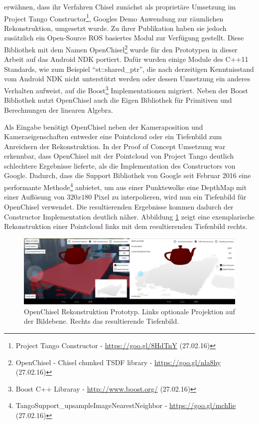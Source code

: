 \citet{Klingensmith_2015_7924} erwähnen, dass ihr Verfahren Chisel zunächst als proprietäre Umsetzung im Project Tango Constructor\footnote{Project Tango Constructor - \url{https://goo.gl/8HdTnY} (27.02.16)}, Googles Demo Anwendung zur räumlichen Rekonstruktion, umgesetzt wurde. Zu ihrer Publikation haben sie jedoch zusätzlich ein Open-Source ROS basiertes Modul zur Verfügung gestellt. Diese Bibliothek mit dem Namen OpenChisel\footnote{OpenChisel - Chisel chunked TSDF library - \url{https://goo.gl/nla8hy} (27.02.16)} wurde für den Prototypen in dieser Arbeit auf das Android NDK portiert. Dafür wurden einige Module des C++11 Standards, wie zum Beispiel \enquote{st::shared\_ptr}, die nach derzeitigen Kenntnisstand vom Android NDK nicht unterstützt werden oder dessen Umsetzung ein anderes Verhalten aufweist, auf die Boost\footnote{Boost C++ Libraray - \url{http://www.boost.org/} (27.02.16)} Implementationen migriert. Neben der Boost Bibliothek nutzt OpenChisel auch die Eigen Bibliothek für Primitiven und Berechnungen der linearen Algebra.

Als Eingabe benötigt OpenChisel neben der Kameraposition und Kameraeigenschaften entweder eine Pointcloud oder ein Tiefenbild zum Anreichern der Rekonstruktion. In der Proof of Concept Umsetzung war erkennbar, dass OpenChisel mit der Pointcloud von Project Tango deutlich schlechtere Ergebnisse lieferte, als die Implementation des Constructors von Google. Dadurch, dass die Support Bibliothek von Google seit Februar 2016 eine performante Methode\footnote{TangoSupport\_upsampleImageNearestNeighbor - \url{https://goo.gl/mchIie} (27.02.16)} anbietet, um aus einer Punktewolke eine DepthMap mit einer Auflösung von \(320x180\) Pixel zu interpolieren, wird nun ein Tiefenbild für OpenChisel verwendet. Die resultierenden Ergebnisse kommen dadurch der Constructor Implementation deutlich näher. Abbildung \ref{fig:chisel-demo} zeigt eine exemplarische Rekonstruktion einer Pointcloud links mit dem resultierenden Tiefenbild rechts.

\begin{figure}[h]
  \centering
	\includegraphics[width=1.0\textwidth]{content/images/implementation/chisel-demo.png} 
  \caption{OpenChisel Rekonstruktion Prototyp. Links optionale Projektion auf der Bildebene. Rechts das resultierende Tiefenbild.}
  \label{fig:chisel-demo}
\end{figure}


